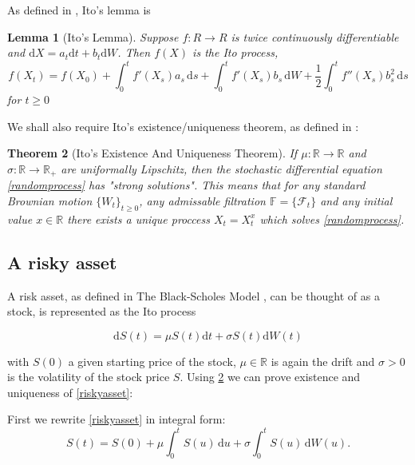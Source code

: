 \documentclass[11pt]{article} %
\newtheorem{theorem}{Theorem}[section]
\newtheorem{lemma}[theorem]{Lemma}
\begin{document}
As defined in \cite{itoprocess}, Ito's lemma is 

\begin{lemma}[Ito's Lemma] 
    \label{itolemma}
    Suppose $f: R \to R$ is twice continuously differentiable and 
    $\mathrm{d}X = a_t\mathrm{d}t + b_t\mathrm{d}W$. Then $f(X)$ is the Ito process,
    \begin{equation}
        f(X_t)
        = f(X_0) + \int_0^t \! f'(X_s)a_s \, \mathrm{d}s + 
        \int_0^t \! f'(X_s)b_s \, \mathrm{d}W + \frac{1}{2}\int_0^t \! f''(X_s)b_s^2 \,
         \mathrm{d}s
    \end{equation}
    for $t\ge0$
\end{lemma}
We shall also require Ito's existence/uniqueness theorem, as defined in 
\cite{SDE}:

\begin{theorem}[Ito's Existence And Uniqueness Theorem] 
    \label{isosexistence}
    If $\mu : \mathbb{R} \to \mathbb{R}$ and $\sigma : \mathbb{R} \to \mathbb{R}_+$ 
    are uniformally Lipschitz, then the stochastic differential equation 
    \ref{randomprocess} has "strong solutions". This means that for any standard 
    Brownian motion $\{W_t\}_{t\geq0}$, any admissable filtration $\mathbb{F} = 
    \{\mathcal{F}_t\}$ and any initial value $x \in \mathbb{R}$ there exists a 
    unique proccess $X_t = X_t^x$ which solves \ref{randomprocess}.

    
\end{theorem}

\subsection{A risky asset}

A risk asset, as defined in The Black-Scholes Model \cite{blackscholes}, 
can be thought of as a stock, is represented as the Ito process

\begin{equation} \label{riskyasset}
    \mathrm{d}S(t) = \mu S(t)\mathrm{d}t + \sigma S(t) \mathrm{d}W(t)
\end{equation}

with $S(0)$ a given starting price of the stock, $\mu \in \mathbb{R}$ 
is again the drift and $\sigma > 0$ is the volatility of the stock 
price $S$. Using \ref{isosexistence} we can prove existence and uniqueness of 
\ref{riskyasset}:

First we rewrite \ref{riskyasset} in integral form:
\begin{equation}\label{riskyint}
    S(t) = S(0) + \mu\int_0^t \! S(u) \, \mathrm{d}u + \sigma\int_0^t \! S(u) \, 
    \mathrm{d}W(u).
\end{equation}
\end{document}
